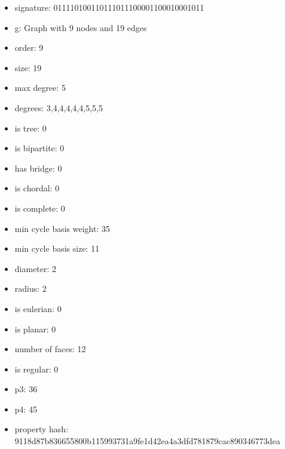 \newpage
\begin{figure}
\end{figure}
\begin{itemize}
\item signature: 011110100110111011100001100010001011
\item g: Graph with 9 nodes and 19 edges
\item order: 9
\item size: 19
\item max degree: 5
\item degrees: 3,4,4,4,4,4,5,5,5
\item is tree: 0
\item is bipartite: 0
\item has bridge: 0
\item is chordal: 0
\item is complete: 0
\item min cycle basis weight: 35
\item min cycle basis size: 11
\item diameter: 2
\item radius: 2
\item is eulerian: 0
\item is planar: 0
\item number of faces: 12
\item is regular: 0
\item p3: 36
\item p4: 45
\item property hash: 9118d87b836655800b115993731a9fe1d42ea4a3dfd781879cac890346773dea
\end{itemize}
